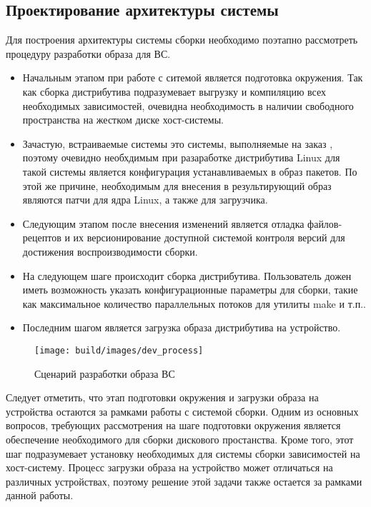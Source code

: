 \subsection{Проектирование архитектуры системы}
Для построения архитектуры системы сборки необходимо поэтапно рассмотреть процедуру разработки образа для ВС.
\begin{itemize}
  \item Начальным этапом при работе с ситемой является подготовка окружения.
        Так как сборка дистрибутива подразумевает выгрузку и компиляцию всех необходимых зависимостей, очевидна необходимость в наличии свободного пространства на жестком диске хост-системы.
  \item Зачастую, встраиваемые системы это системы, выполняемые на заказ \cite{EMBEDDED}, поэтому очевидно необхдимым при разаработке дистрибутива Linux для такой системы является конфигурация устанавливаемых в образ пакетов.
        По этой же причине, необходимым для внесения в результирующий образ являются патчи для ядра Linux, а также для загрузчика.
  \item Следующим этапом после внесения изменений является отладка файлов-рецептов и их версионирование доступной системой контроля версий для достижения воспроизводимости сборки.
  \item На следующем шаге происходит сборка дистрибутива.
        Пользователь дожен иметь возможность указать конфигурационные параметры для сборки, такие как максимальное количество параллельных потоков для утилиты make и т.п..
  \item Последним шагом является загрузка образа дистрибутива на устройство.
\end{itemize}

\newpage
\begin{figure}[h!]
  \centering
  \setlength{\fboxsep}{5pt}
  \texttt{[image: build/images/dev\_process]}
  \caption{Сценарий разработки образа ВС}\label{fig: dev_process}
\end{figure}

Следует отметить, что этап подготовки окружения и загрузки образа на устройства остаются за рамками работы с системой сборки.
Одним из основных вопросов, требующих рассмотрения на шаге подготовки окружения является обеспечение необходимого для сборки дискового простанства.
Кроме того, этот шаг подразумевает установку необходимых для системы сборки зависимостей на хост-систему.
Процесс загрузки образа на устройство может отличаться на различных устройствах, поэтому решение этой задачи также остается за рамками данной работы.

